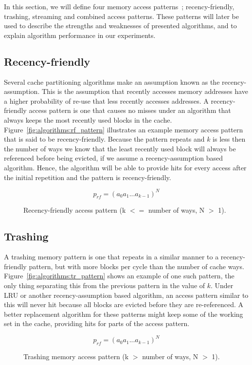 In this section, we will define four memory access patterns~\cite{Jaleel2010}; recency-friendly, trashing, streaming and combined access patterns.
These patterns will later be used to describe the strengths and weaknesses of presented algorithms, and to explain algorithm performance in our experiments.

\subsection{Recency-friendly}
Several cache partitioning algorithms make an assumption known as the recency-assumption.
This is the assumption that recently accesses memory addresses have a higher probability of re-use that less recently accesses addresses.
A recency-friendly access pattern is one that causes no misses under an algorithm that always keeps the most recently used blocks in the cache.
Figure~\ref{fig:algorithms:rf_pattern} illustrates an example memory access pattern that is said to be recency-friendly.
Because the pattern repeats and $k$ is less then the number of ways we know that the least recently used block will always be referenced before being evicted, if we assume a recency-assumption based algorithm.
Hence, the algorithm will be able to provide hits for every access after the initial repetition and the pattern is recency-friendly.

\begin{figure}[ht]
\centering
\begin{equation} \label{fig:algorithms:rf_pattern}
p_{rf} = (a_0 a_1 ... a_{k-1})^N
\end{equation}
\caption{Recency-friendly access pattern (k $<=$ number of ways, N $>$ 1).}
\end{figure}

\subsection{Trashing}
A trashing memory pattern is one that repeats in a similar manner to a recency-friendly pattern, but with more blocks per cycle than the number of cache ways. 
Figure~\ref{fig:algorithms:tr_pattern} shows an example of one such pattern, the only thing separating this from the previous pattern in the value of $k$.
Under LRU or another recency-assumption based algorithm, an access pattern similar to this will never hit because all blocks are evicted before they are re-referenced.
A better replacement algorithm for these patterns might keep some of the working set in the cache, providing hits for parts of the access pattern.
\begin{figure}[ht]
\centering
\begin{equation} \label{fig:algorithms:tr_pattern}
p_{rf} = (a_0 a_1 ... a_{k-1})^N
\end{equation}
\caption{Trashing memory access pattern (k $>$ number of ways, N $>$ 1).}
\end{figure}

